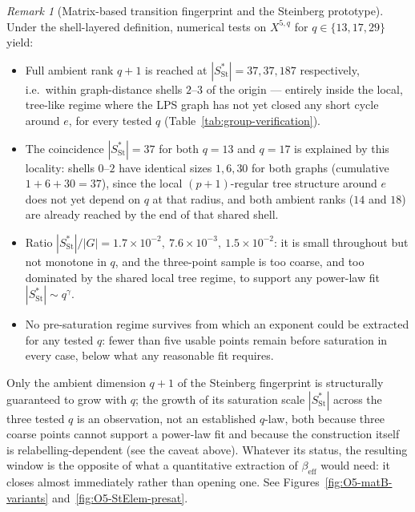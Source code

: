 \documentclass[11pt,a4paper]{article}
\theoremstyle{plain}
\theoremstyle{definition}
\theoremstyle{remark}
\newtheorem{remark}[theorem]{Remark}
\newcommand{\betaeff}{\beta_{\mathrm{eff}}}
\begin{document}
\begin{remark}[Matrix-based transition fingerprint and the Steinberg prototype]
        Under the shell-layered definition, numerical tests on $X^{5,q}$ for $q \in \{13, 17, 29\}$
        yield:
        \begin{itemize}[nosep]
\item Full ambient rank $q+1$ is reached at $|S^*_{\mathrm{St}}| = 37, 37, 187$ respectively, i.e.\
within graph-distance shells $2$--$3$ of the origin --- entirely inside the local, tree-like
regime where the LPS graph has not yet closed any short cycle around $e$, for every tested $q$
(Table~\ref{tab:group-verification}).
\item The coincidence $|S^*_{\mathrm{St}}|=37$ for both $q=13$ and $q=17$ is explained by this
locality: shells $0$--$2$ have identical sizes $1, 6, 30$ for both graphs (cumulative $1+6+30=37$),
since the local $(p+1)$-regular tree structure around $e$ does not yet depend on $q$ at that radius,
and both ambient ranks ($14$ and $18$) are already reached by the end of that shared shell.
\item Ratio $|S^*_{\mathrm{St}}|/|G| = 1.7\times10^{-2},\ 7.6\times10^{-3},\ 1.5\times10^{-2}$: it is
small throughout but not monotone in $q$, and the three-point sample is too coarse, and too
dominated by the shared local tree regime, to support any power-law fit
$|S^*_{\mathrm{St}}| \sim q^\gamma$.
\item No pre-saturation regime survives from which an exponent could be extracted for any tested
$q$: fewer than five usable points remain before saturation in every case, below what any reasonable
fit requires.
        \end{itemize}
        Only the ambient dimension $q+1$ of the Steinberg fingerprint is structurally guaranteed to
        grow with $q$; the growth of its saturation scale $|S^*_{\mathrm{St}}|$ across the three
        tested $q$ is an observation, not an established $q$-law, both because three coarse points
        cannot support a power-law fit and because the construction itself is relabelling-dependent
        (see the caveat above).
        Whatever its status, the resulting window is the opposite of what a quantitative extraction
        of $\betaeff$ would need: it closes almost immediately rather than opening one.
        See Figures~\ref{fig:O5-matB-variants} and~\ref{fig:O5-StElem-presat}.
      \end{remark}
\end{document}

